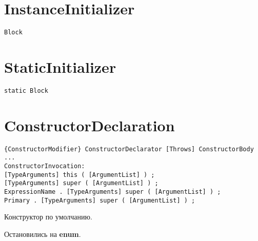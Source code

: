\documentclass[a4paper,12pt]{article}
\begin{document}
\section*{InstanceInitializer}
\begin{verbatim}
Block
\end{verbatim}

\section*{StaticInitializer}
\begin{verbatim}
static Block
\end{verbatim}

\section*{ConstructorDeclaration}
\begin{verbatim}
{ConstructorModifier} ConstructorDeclarator [Throws] ConstructorBody
...
ConstructorInvocation:
[TypeArguments] this ( [ArgumentList] ) ;
[TypeArguments] super ( [ArgumentList] ) ;
ExpressionName . [TypeArguments] super ( [ArgumentList] ) ;
Primary . [TypeArguments] super ( [ArgumentList] ) ;
\end{verbatim}

Конструктор по умолчанию.

\bigskip
Остановились на \textbf{enum}.
\end{document}
